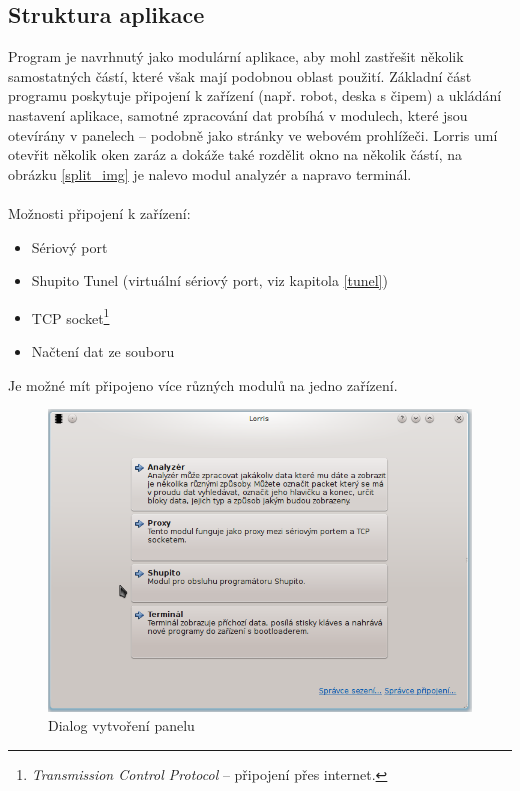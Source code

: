 \documentclass[12pt, a4paper, oneside]{article}
\newcommand{\It}{\textit}  %
\begin{document}
\subsection{Struktura aplikace}
Program je navrhnutý jako modulární aplikace, aby mohl zastřešit několik samostatných částí, které však mají podobnou oblast použití. Základní část programu poskytuje připojení k zařízení (např. robot, deska s čipem) a ukládání nastavení aplikace, samotné zpracování dat probíhá v modulech, které jsou otevírány v panelech -- podobně jako stránky ve webovém prohlížeči. Lorris umí otevřit několik oken zaráz a dokáže také rozdělit okno na několik částí, na obrázku \ref{split_img} je nalevo modul analyzér a napravo terminál. \\
\\
\noindent Možnosti připojení k zařízení:
\begin{itemize}
    \item Sériový port
    \item Shupito Tunel (virtuální sériový port, viz kapitola \ref{tunel})
    \item TCP socket\footnote{\It{Transmission Control Protocol} -- připojení přes internet.}
    \item Načtení dat ze souboru
\end{itemize}
Je možné mít připojeno více různých modulů na jedno zařízení.  


\begin{figure}[H]
\begin{center}
\includegraphics[scale=0.6]{img/new_tab.png}
\caption{Dialog vytvoření panelu}
\end{center}
\end{figure}
\end{document}
